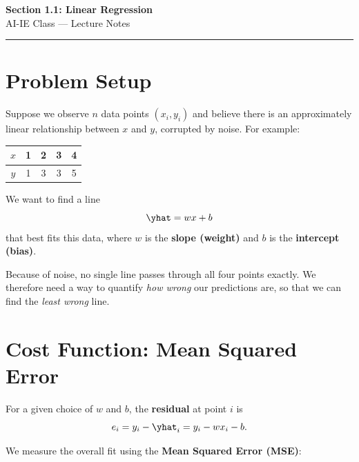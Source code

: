 \documentclass[12pt, a4paper]{article}
\begin{document}
\begin{center}
  {\LARGE \textbf{Section 1.1: Linear Regression}} \\[0.5em]
  {\large AI-IE Class — Lecture Notes}%
  \ifstudentmode
  \fi
\end{center}

\vspace{1em}
\hrule
\vspace{1.5em}

\section{Problem Setup}

Suppose we observe $n$ data points $(x_i, y_i)$ and believe there is an
approximately linear relationship between $x$ and $y$, corrupted by noise.
For example:

\begin{center}
  \begin{tabular}{ccccc}
    \toprule
    $x$ & 1 & 2 & 3 & 4 \\
    \midrule
    $y$ & 1 & 3 & 3 & 5 \\
    \bottomrule
  \end{tabular}
\end{center}

We want to find a line
\[
  \yhat = wx + b
\]
that best fits this data, where $w$ is the \textbf{slope (weight)} and $b$
is the \textbf{intercept (bias)}.

Because of noise, no single line passes through all four points exactly.
We therefore need a way to quantify \emph{how wrong} our predictions are, so
that we can find the \emph{least wrong} line.


\section{Cost Function: Mean Squared Error}

For a given choice of $w$ and $b$, the \textbf{residual} at point $i$ is
\[
  e_i = y_i - \yhat_i = y_i - wx_i - b.
\]

We measure the overall fit using the \textbf{Mean Squared Error (MSE)}:
\end{document}
